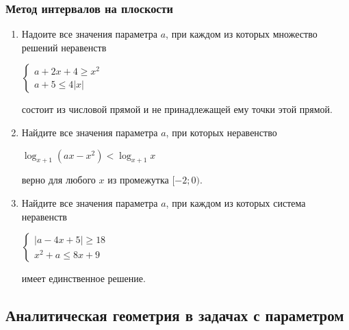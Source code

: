 \documentclass[12pt]{article}
\begin{document}
\subsubsection{Метод интервалов на плоскости}
 \begin{enumerate}[start=1,label={\itshape\bfseries \arabic*.}]
    \item Надоите все значения параметра $a$, при каждом из которых множество решений неравенств
    \begin{center}
        $\begin{cases}
            a + 2x + 4 \ge x^2 \\
            a + 5 \le 4|x|
        \end{cases}$
    \end{center}
    состоит из числовой прямой и не принадлежащей ему точки этой прямой.
    \item Найдите все значения параметра $a$, при которых неравенство
    \begin{center}
        $\log_{x + 1}{(ax - x^2)} < \log_{x + 1}{x}$
    \end{center}
    верно для любого $x$ из промежутка $[-2; 0)$.
    \item Найдите все значения параметра $a$, при каждом из которых система неравенств
    \begin{center}
    $\begin{cases}
        |a - 4x + 5| \ge 18\\
        x^2 + a \le 8x + 9
    \end{cases}$
    \end{center}
    имеет единственное решение.
\end{enumerate}








\subsection{Аналитическая геометрия в задачах с параметром}
\end{document}
